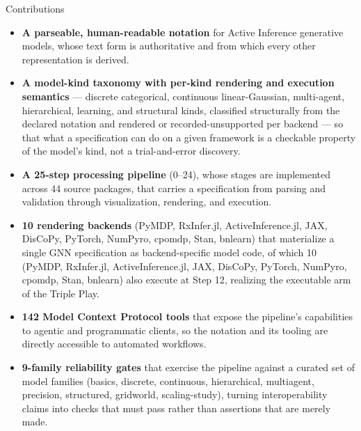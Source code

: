 \documentclass[
  ignorenonframetext,
]{beamer}
\providecommand{\tightlist}{%
  \setlength{\itemsep}{0pt}\setlength{\parskip}{0pt}}
\begin{document}
\begin{frame}[allowframebreaks]{Contributions}
\begin{itemize}
\tightlist
\item
  \textbf{A parseable, human-readable notation} for Active Inference
  generative models, whose text form is authoritative and from which
  every other representation is derived.
\item
  \textbf{A model-kind taxonomy with per-kind rendering and execution
  semantics} --- discrete categorical, continuous linear-Gaussian,
  multi-agent, hierarchical, learning, and structural kinds, classified
  structurally from the declared notation and rendered or
  recorded-unsupported per backend --- so that what a specification can
  do on a given framework is a checkable property of the model's kind,
  not a trial-and-error discovery.
\item
  \textbf{A 25-step processing pipeline} (0--24), whose stages are
  implemented across 44 source packages, that carries a specification
  from parsing and validation through visualization, rendering, and
  execution.
\item
  \textbf{10 rendering backends} (PyMDP, RxInfer.jl, ActiveInference.jl,
  JAX, DisCoPy, PyTorch, NumPyro, cpomdp, Stan, bnlearn) that
  materialize a single GNN specification as backend-specific model code,
  of which 10 (PyMDP, RxInfer.jl, ActiveInference.jl, JAX, DisCoPy,
  PyTorch, NumPyro, cpomdp, Stan, bnlearn) also execute at Step 12,
  realizing the executable arm of the Triple Play.
\item
  \textbf{142 Model Context Protocol tools} that expose the pipeline's
  capabilities to agentic and programmatic clients, so the notation and
  its tooling are directly accessible to automated workflows.
\item
  \textbf{9-family reliability gates} that exercise the pipeline against
  a curated set of model families (basics, discrete, continuous,
  hierarchical, multiagent, precision, structured, gridworld,
  scaling-study), turning interoperability claims into checks that must
  pass rather than assertions that are merely made.
\end{itemize}
\end{frame}
\end{document}
